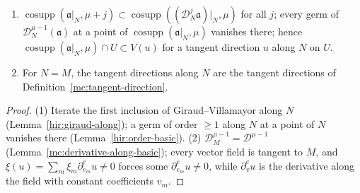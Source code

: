 \begin{lemma}
\label{mc:tangent-direction-along-basic}
\leanok
\begin{enumerate}
\item \(\operatorname{cosupp}(\mathfrak a|_N,\mu+j)\subset\operatorname{cosupp}((\mathcal D_N^j\mathfrak a)|_N,\mu)\) for all \(j\); every germ of \(\mathcal D_N^{\mu-1}(\mathfrak a)\) at a point of
\(\operatorname{cosupp}(\mathfrak a|_N,\mu)\) vanishes there; hence \(\operatorname{cosupp}(\mathfrak a|_N,\mu)\cap U\subset V(u)\) for a tangent direction \(u\) along \(N\) on \(U\).
\item For \(N=M\), the tangent directions along \(N\) are the tangent directions of Definition~\ref{mc:tangent-direction}.
\end{enumerate}
\end{lemma}
\begin{proof}
\leanok
(1) Iterate the first inclusion of Giraud--Villamayor along \(N\) (Lemma~\ref{hir:giraud-along}); a germ of order \(\ge1\) along \(N\) at a point of \(N\) vanishes
there (Lemma~\ref{hir:order-basic}). (2) \(\mathcal D_M^{\mu-1}=\mathcal D^{\mu-1}\) (Lemma~\ref{mc:derivative-along-basic}); every vector field is tangent to \(M\), and
\(\xi(u)=\sum_m\xi_m\partial^e_{e_m}u\ne0\) forces some \(\partial^e_{e_m}u\ne0\), while \(\partial^e_vu\) is the derivative along the field with constant coefficients \(v_m\).
\end{proof}

